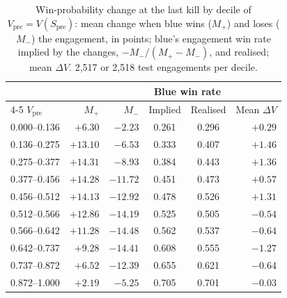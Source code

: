 \begin{table}[!t]
\centering
\caption{Win-probability change at the last kill by decile of $V_{\mathrm{pre}} = V(S_{\mathrm{pre}})$:
mean change when blue wins ($M_+$) and loses ($M_-$) the engagement, in points; blue's engagement win
rate implied by the changes, $-M_-/(M_+ - M_-)$, and realised; mean $\Delta V$. 2,517 or 2,518
test engagements per decile.}
\label{tab:limit-swing}
\footnotesize
\setlength{\tabcolsep}{3.5pt}
\begin{tabular}{@{}lrrccr@{}}
\toprule
 & & & \multicolumn{2}{c}{Blue win rate} & \\
\cmidrule(lr){4-5}
$V_{\mathrm{pre}}$ & $M_+$ & $M_-$ & Implied & Realised & Mean $\Delta V$ \\
\midrule
0.000--0.136 & $+6.30$ & $-2.23$ & 0.261 & 0.296 & $+0.29$ \\
0.136--0.275 & $+13.10$ & $-6.53$ & 0.333 & 0.407 & $+1.46$ \\
0.275--0.377 & $+14.31$ & $-8.93$ & 0.384 & 0.443 & $+1.36$ \\
0.377--0.456 & $+14.28$ & $-11.72$ & 0.451 & 0.473 & $+0.57$ \\
0.456--0.512 & $+14.13$ & $-12.92$ & 0.478 & 0.526 & $+1.31$ \\
0.512--0.566 & $+12.86$ & $-14.19$ & 0.525 & 0.505 & $-0.54$ \\
0.566--0.642 & $+11.28$ & $-14.48$ & 0.562 & 0.537 & $-0.64$ \\
0.642--0.737 & $+9.28$ & $-14.41$ & 0.608 & 0.555 & $-1.27$ \\
0.737--0.872 & $+6.52$ & $-12.39$ & 0.655 & 0.621 & $-0.64$ \\
0.872--1.000 & $+2.19$ & $-5.25$ & 0.705 & 0.701 & $-0.03$ \\
\bottomrule
\end{tabular}
\end{table}

